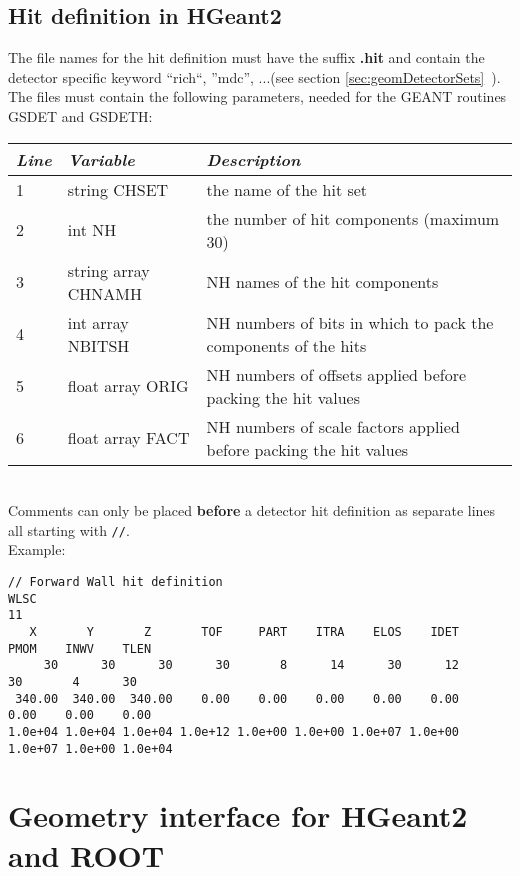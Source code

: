 \subsection[Hit definition in HGeant2]{Hit definition in HGeant2}

The file names for the hit definition must have the suffix \textbf{.hit} and contain the detector specific keyword ``rich``, 
''mdc'', ...(see section \ref{sec:geomDetectorSets}~).\\
The files must contain the following parameters, needed for the GEANT routines GSDET and GSDETH:\\
\begin{tabular}{|l||l|l|}
  \hline
  \cellcolor{lightgray} \textit{Line} & \cellcolor{lightgray} \textit{Variable} & \cellcolor{lightgray} \textit{Description}\\
  \hline
  1 & string CHSET & the name of the hit set\\
  \hline
  2 & int NH & the number of hit components (maximum 30)\\
  \hline
  3 & string array CHNAMH & NH names of the hit components\\
  \hline
  4 & int array NBITSH    & NH numbers of bits in which to pack the components of the hits\\
  \hline
  5 & float array ORIG    & NH numbers of offsets applied before packing the hit values\\
  \hline
  6 & float array FACT    & NH numbers of scale factors applied before packing the hit values\\
  \hline
\end{tabular}\\

Comments can only be placed \textbf{before} a detector hit definition as separate lines all starting with \verb+//+.\\

Example:
\begin{lstlisting}
// Forward Wall hit definition
WLSC
11
   X       Y       Z       TOF     PART    ITRA    ELOS    IDET    PMOM    INWV    TLEN 
     30      30      30      30       8      14      30      12      30       4      30 
 340.00  340.00  340.00    0.00    0.00    0.00    0.00    0.00    0.00    0.00    0.00 
1.0e+04 1.0e+04 1.0e+04 1.0e+12 1.0e+00 1.0e+00 1.0e+07 1.0e+00 1.0e+07 1.0e+00 1.0e+04 
\end{lstlisting}


\section[Geometry interface for HGeant2 and ROOT]{Geometry interface for HGeant2 and ROOT} \label{sec:geomInterface}

